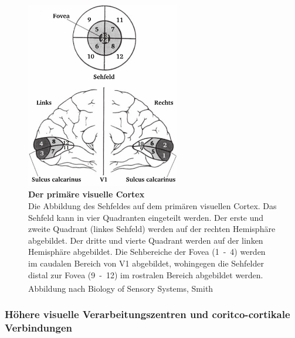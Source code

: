\documentclass[12pt,a4paper,pdftex]{article}
\begin{document}
\begin{figure}[H]
    \centering
    \includegraphics[width = 0.6\textwidth]{pictures/visual/V1.png}
    \caption[Der primäre visuelle Cortex]{\textbf{Der primäre visuelle Cortex}\\
    Die Abbildung des Sehfeldes auf dem primären visuellen Cortex. Das Sehfeld kann in vier Quadranten eingeteilt werden. Der erste und zweite Quadrant (linkes Sehfeld) werden auf der rechten Hemisphäre abgebildet. Der dritte und vierte Quadrant werden auf der linken Hemisphäre abgebildet. Die Sehbereiche der Fovea (1~-~4) werden im caudalen Bereich von V1 abgebildet, wohingegen die Sehfelder distal zur Fovea (9~-~12) im rostralen Bereich abgebildet werden.\\
    Abbildung nach Biology of Sensory Systems, Smith \textsuperscript{\cite[18]{smith2008biology}}}
    \label{fig:V1}
\end{figure}


\subsubsection*{Höhere visuelle Verarbeitungszentren und coritco-cortikale Verbindungen}
\end{document}
